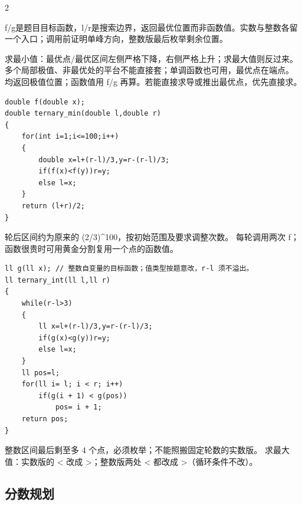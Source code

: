 \documentclass[UTF8,fontset=fandol,a4paper,twoside]{ctexart}
\newcommand{\note}[1]{{\fontsize{10}{12}\selectfont #1\par}}
\begin{document}
\begin{multicols}{2}
\note{f/\allowbreak{}g是题目目标函数，l/\allowbreak{}r是搜索边界，返回最优位置而非函数值。实数与整数各留一个入口；调用前证明单峰方向，整数版最后枚举剩余位置。}
\note{求最小值：最优点/\allowbreak{}最优区间左侧严格下降，右侧严格上升；求最大值则反过来。 多个局部极值、非最优处的平台不能直接套；单调函数也可用，最优点在端点。 均返回极值位置；函数值用 f/\allowbreak{}g 再算。若能直接求导或推出最优点，优先直接求。}
\begin{lstlisting}
double f(double x);
double ternary_min(double l,double r)
{
    for(int i=1;i<=100;i++)
    {
        double x=l+(r-l)/3,y=r-(r-l)/3;
        if(f(x)<f(y))r=y;
        else l=x;
    }
    return (l+r)/2;
}
\end{lstlisting}
\note{100 轮后区间约为原来的 (\allowbreak{}2/\allowbreak{}3)\allowbreak{}\textasciicircum{}100，按初始范围及要求调整次数。 每轮调用两次 f；函数很贵时可用黄金分割复用一个点的函数值。}
\begin{lstlisting}
ll g(ll x); // 整数自变量的目标函数；值类型按题意改，r-l 须不溢出。
ll ternary_int(ll l,ll r)
{
    while(r-l>3)
    {
        ll x=l+(r-l)/3,y=r-(r-l)/3;
        if(g(x)<g(y))r=y;
        else l=x;
    }
    ll pos=l;
    for(ll i= l; i < r; i++)
        if(g(i + 1) < g(pos))
            pos= i + 1;
    return pos;
}
\end{lstlisting}
\note{整数区间最后剩至多 4 个点，必须枚举；不能照搬固定轮数的实数版。 求最大值：实数版的 <\allowbreak{} 改成 >\allowbreak{}；整数版两处 <\allowbreak{} 都改成 >\allowbreak{}（循环条件不改）。}
\subsection{分数规划}


\end{multicols}
\end{document}
